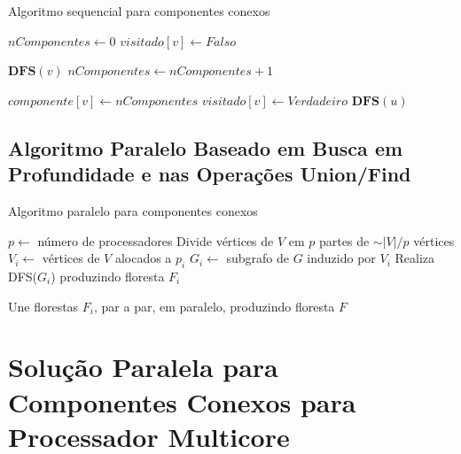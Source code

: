 \documentclass[12pt]{article}
\begin{document}
\begin{algorithm}[h]
    \DontPrintSemicolon
    \caption{Algoritmo sequencial para componentes conexos}
	{
        $nComponentes \gets 0$\;
        {
            $visitado[v] \gets F\!also$\;
        }
    
        {
            {
                $\textbf{DFS}(v)$\;
                $nComponentes \gets nComponentes + 1$\;
            }
        }
    }
    
    {
        $componente[v] \gets nComponentes$\; 
        $visitado[v] \gets V\!erdadeiro$\;
        {
            {
                $\textbf{DFS}(u)$\;
            }
        }
    }
\end{algorithm}

\subsection{Algoritmo Paralelo Baseado em Busca em Profundidade e nas Operações Union/Find}

{\color{gray}\lipsum[1]}

\begin{algorithm}[h]
    \DontPrintSemicolon
    \caption{Algoritmo paralelo para componentes conexos}
    {
        $p \gets$ número de processadores\;
        Divide vértices de $V$ em $p$ partes de $\sim|V|/p$ vértices\;
        {
            $V_i \gets$ vértices de $V$ alocados a $p_i$\;
            $G_i \gets$ subgrafo de $G$ induzido por $V_i$\;
            Realiza DFS($G_i$) produzindo floresta $F_i$\;
        }

        Une florestas $F_i$, par a par, em paralelo, produzindo floresta $F$\;
        
    }
\end{algorithm}

\section{Solução Paralela para Componentes Conexos para Processador Multicore}
\end{document}
